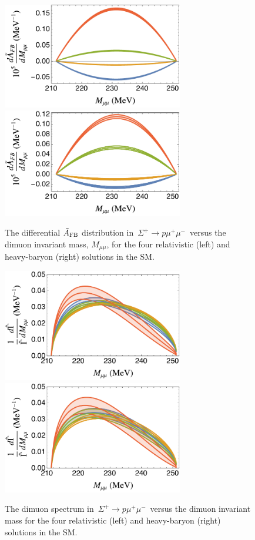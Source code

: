 \documentclass[amsmath,amssymb,aps,nofootinbib,prd,preprint,superscriptaddress,tightenlines,a4paper,bm]{revtex4-2}
\begin{document}
\begin{figure}[!t] 
\includegraphics[width=3.1in]{compafbrel.pdf} ~ ~ \includegraphics[width=3.1in]{compafbhb.pdf} \vspace{-1ex}
\caption{The differential $\tilde{A}_{\rm FB}$ distribution in \,$\Sigma^+\to p \mu^+\mu^-$\, versus the dimuon invariant mass, $M_{\mu\mu}$, for the four relativistic (left) and heavy-baryon (right) solutions in the SM.} \label{f:afbtil}
\end{figure}

\begin{figure}[!b] \bigskip
\includegraphics[width=3.1in]{compdGrel.pdf} ~ ~ \includegraphics[width=3.1in]{compdGhb.pdf} \vspace{-1ex}
\caption{The dimuon spectrum in \,$\Sigma^+\to p \mu^+\mu^-$\, versus the dimuon invariant mass for the four relativistic (left) and heavy-baryon (right) solutions in the SM.} \label{f:dimuonsp}
\end{figure}
\end{document}
